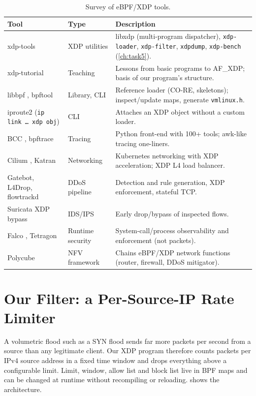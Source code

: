 \begin{table}[htbp]
	\centering\footnotesize
	\caption{Survey of eBPF/XDP tools.}\label{tab:t4-tools}
	\begin{tabularx}{\linewidth}{>{\raggedright\arraybackslash}p{4.3cm}>{\raggedright\arraybackslash}p{2.2cm}X}
		\toprule
		Tool & Type & Description \\
		\midrule
		xdp-tools \autocite{xdptools_github} & XDP utilities & libxdp (multi-program dispatcher), \texttt{xdp-loader}, \texttt{xdp-filter}, \texttt{xdpdump}, \texttt{xdp-bench} (\cref{ch:task5}). \\
		xdp-tutorial \autocite{xdp_tutorial} & Teaching & Lessons from basic programs to AF\_XDP; basis of our program's structure. \\
		libbpf \autocite{libbpf_github}, bpftool \autocite{kdoc_bpf} & Library, CLI & Reference loader (CO-RE, skeletons); inspect/update maps, generate \texttt{vmlinux.h}. \\
		iproute2 (\texttt{ip link \dots\ xdp obj}) & CLI & Attaches an XDP object without a custom loader. \\
		BCC \autocite{bcc_github}, bpftrace \autocite{bpftrace_github} & Tracing & Python front-end with 100+ tools; awk-like tracing one-liners. \\
		Cilium \autocite{cilium_kpr}, Katran \autocite{katran_github} & Networking & Kubernetes networking with XDP acceleration; XDP L4 load balancer. \\
		Gatebot, L4Drop, flowtrackd \autocite{cf_gatebot,cf_l4drop,cf_flowtrackd} & DDoS pipeline & Detection and rule generation, XDP enforcement, stateful TCP. \\
		Suricata XDP bypass \autocite{suricata_ebpf} & IDS/IPS & Early drop/bypass of inspected flows. \\
		Falco \autocite{falco}, Tetragon \autocite{tetragon} & Runtime security & System-call/process observability and enforcement (not packets). \\
		Polycube \autocite{polycube_github} & NFV framework & Chains eBPF/XDP network functions (router, firewall, DDoS mitigator). \\
		\bottomrule
	\end{tabularx}
\end{table}

\section{Our Filter: a Per-Source-IP Rate Limiter}\label{sec:t4-design}
A volumetric flood such as a SYN flood sends far more packets per second from a source than any legitimate client. Our XDP program therefore counts packets per IPv4 source address in a fixed time window and drops everything above a configurable limit. Limit, window, allow list and block list live in BPF maps and can be changed at runtime without recompiling or reloading.  shows the architecture.

